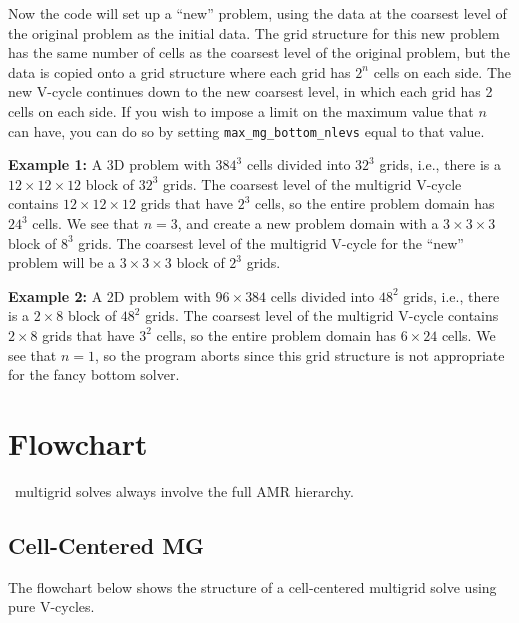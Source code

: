 Now the code will set up a ``new'' problem, using the data at the coarsest level
of the original problem as the initial data.  The grid structure for this new
problem has the same number of cells as the coarsest level of the original problem,
but the data is copied onto a grid structure where each grid has $2^n$ cells
on each side.  The new V-cycle continues down to the new coarsest level, in
which each grid has 2 cells on each side.  If you wish to impose a limit on
the maximum value that $n$ can have, you can do so by setting 
{\tt max\_mg\_bottom\_nlevs} equal to that value.

{\bf Example 1:} A 3D problem with $384^3$ cells divided into $32^3$ grids, i.e., 
there is a $12\times 12\times 12$ block of $32^3$ grids.  The coarsest level of the 
multigrid V-cycle contains $12\times 12\times 12$ grids that have $2^3$ cells, so the 
entire problem domain has $24^3$ cells.  We see that $n=3$, and create a new problem 
domain with a $3\times 3\times 3$ block of $8^3$ grids.  The coarsest level of the 
multigrid V-cycle for the ``new'' problem will be a $3\times 3\times 3$ block of 
$2^3$ grids.

{\bf Example 2:} A 2D problem with $96\times 384$ cells divided into $48^2$ grids, i.e., 
there is a $2\times 8$ block of $48^2$ grids.  The coarsest level of the multigrid 
V-cycle contains $2\times 8$ grids that have $3^2$ cells, so the entire problem 
domain has $6\times 24$ cells.  We see that $n=1$, so the program aborts since this grid
structure is not appropriate for the fancy bottom solver.


\section{Flowchart}

\maestro\ multigrid solves always involve the full AMR hierarchy.



\subsection{Cell-Centered MG}

The flowchart below shows the structure of a cell-centered multigrid
solve using pure V-cycles.


